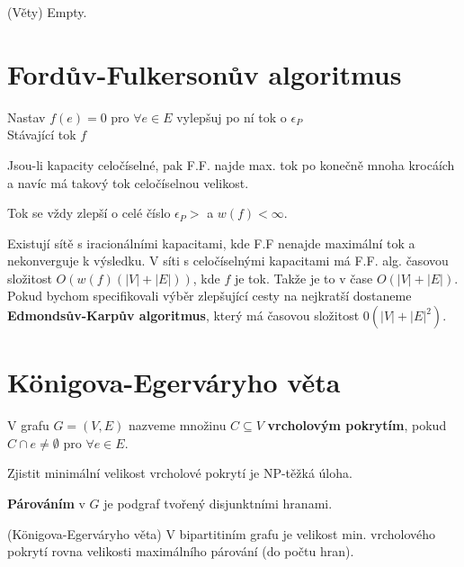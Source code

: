 \begin{dukaz} (Věty)
	Empty.
\end{dukaz}

\section{Fordův-Fulkersonův algoritmus}

\begin{algorithmic}[1]
	\State Nastav $f(e) = 0$ pro $\forall e \in E$
	\State  vylepšuj po ní tok o $\epsilon_P$
	\EndWhile\\
	\Return Stávající tok $f$
\end{algorithmic}

\begin{veta}[o celočíselnosti]
	Jsou-li kapacity celočíselné, pak F.F. najde max. tok po konečně mnoha krocáích a navíc má takový tok celočíselnou velikost.
\end{veta}

\begin{dukaz}
	Tok se vždy zlepší o celé číslo $\epsilon_P >$ a $w(f) < \infty$.
\end{dukaz}

Existují sítě s iracionálními kapacitami, kde F.F nenajde maximální tok a nekonverguje k výsledku. V síti s celočíselnými kapacitami má F.F. alg. časovou složitost $O(w(f)(|V|+|E|))$, kde $f$ je tok. Takže je to v čase $O(|V|+|E|)$. Pokud bychom specifikovali výběr zlepšující cesty na nejkratší dostaneme \textbf{Edmondsův-Karpův algoritmus}, který má časovou složitost $0(|V|+|E|^2)$.

\section{Königova-Egerváryho věta}

\begin{definice}
	V grafu $G = (V,E)$ nazveme množinu $C \subseteq V$ \textbf{vrcholovým pokrytím}, pokud $C \cap e \neq \emptyset$ pro $\forall e \in E$.
\end{definice}

Zjistit minimální velikost vrcholové pokrytí je NP-těžká úloha.

\begin{definice}
	\textbf{Párováním} v $G$ je podgraf tvořený disjunktními hranami.
\end{definice}

\begin{veta}(Königova-Egerváryho věta)
	V bipartitiním grafu je velikost min. vrcholového pokrytí rovna velikosti maximálního párování (do počtu hran).
\end{veta}

